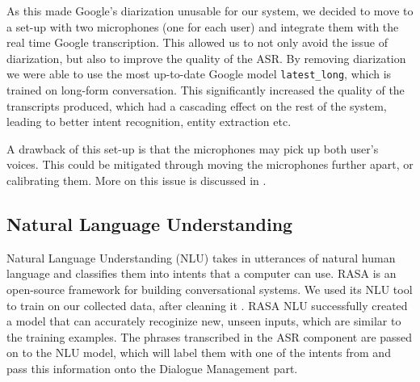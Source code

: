 \documentclass[hidelinks, 11pt]{article}
\begin{document}
As this made Google's diarization unusable for our system, we decided to move to a set-up with two microphones (one for each user) and integrate them with the real time Google transcription. This allowed us to not only avoid the issue of diarization, but also to improve the quality of the ASR. By removing diarization we were able to use the most up-to-date Google model \verb|latest_long|, which is trained on long-form  conversation. This significantly increased the quality of the transcripts produced, which had a cascading effect on the rest of the system, leading to better intent recognition, entity extraction etc.

A drawback of this set-up is that the microphones may pick up both user's voices. This could be mitigated through moving the microphones further apart, or calibrating them. More on this issue is discussed in .

\subsection{Natural Language Understanding}
\label{subsec:nlu}

Natural Language Understanding (NLU) takes in utterances of natural human language and classifies them into intents that a computer can use. RASA is an open-source framework for building conversational systems. We used its NLU tool to train on our collected data, after cleaning it . RASA NLU successfully created a model that can accurately recoginize new, unseen inputs, which are similar to the training examples. The phrases transcribed in the ASR component are passed on to the NLU model, which will label them with one of the intents from  and pass this information onto the Dialogue Management part.


\end{document}
